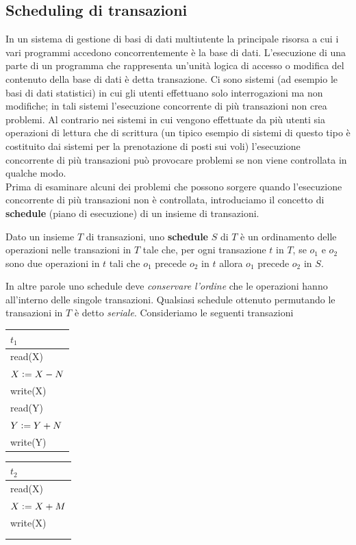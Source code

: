 \subsection{Scheduling di transazioni}
In un sistema di gestione di basi di dati multiutente la principale risorsa a cui i vari programmi
accedono concorrentemente è la base di dati. L'esecuzione di una parte di un programma che
rappresenta un'unità logica di accesso o modifica del contenuto della base di dati è detta
transazione. Ci sono sistemi (ad esempio le basi di dati statistici) in cui gli utenti effettuano solo
interrogazioni ma non modifiche; in tali sistemi l'esecuzione concorrente di più transazioni non crea
problemi. Al contrario nei sistemi in cui vengono effettuate da più utenti sia operazioni di lettura
che di scrittura (un tipico esempio di sistemi di questo tipo è costituito dai sistemi per la
prenotazione di posti sui voli) l'esecuzione concorrente di più transazioni può provocare problemi
se non viene controllata in qualche modo.\\
Prima di esaminare alcuni dei problemi che possono sorgere quando l'esecuzione concorrente di più
transazioni non è controllata, introduciamo il concetto di \textbf{schedule} (piano di esecuzione) di un
insieme di transazioni.
\begin{defn}
Dato un insieme $T$ di transazioni, uno \textbf{schedule} $S$ di $T$ è un ordinamento delle
operazioni nelle transazioni in $T$ tale che, per ogni transazione $t$ in $T$, se $o_1$ e $o_2$ sono due operazioni
in $t$ tali che $o_1$ precede $o_2$ in $t$ allora $o_1$ precede $o_2$ in $S$.
\end{defn}
In altre parole uno schedule deve \emph{conservare l'ordine} che le operazioni hanno all'interno delle singole 
transazioni. Qualsiasi schedule ottenuto permutando le transazioni in $T$ è detto \emph{seriale}.
Consideriamo le seguenti transazioni

\begin{multicols}{2}  
 \begin{tabular}{|l|}
   \hline
   $t_1$\\
   \hline
   read(X)\\ 
   $X\vcentcolon=X-N$\\ 
   write(X)\\ 
   read(Y)\\
   $Y\vcentcolon=Y+N$\\
   write(Y)\\
   \hline
  \end{tabular} 
  
 \begin{tabular}{|l|}
  \hline
   $t_2$\\
   \hline
   read(X)\\ 
   $X\vcentcolon=X+M$\\ 
   write(X)\\
   \\
   \\
   \hline
  \end{tabular}\\
 \end{multicols}
 
